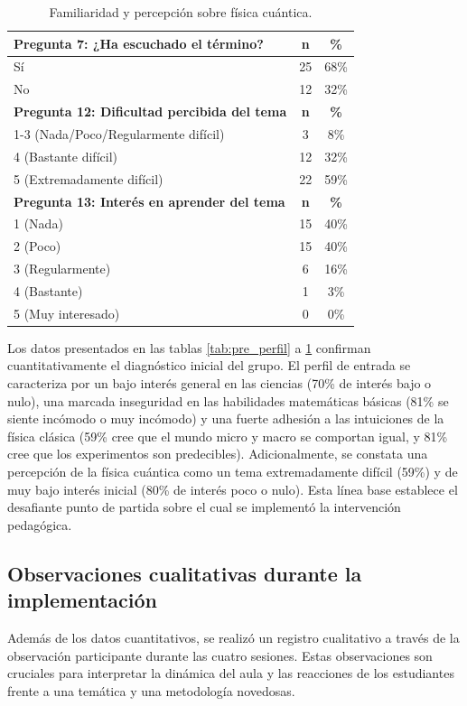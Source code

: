\documentclass[10pt,a4paper]{article}
\begin{document}
\begin{table}[h!]
\centering
\caption{Familiaridad y percepción sobre física cuántica.}
\label{tab:pre_quantum}
\begin{tabular}{|l|c|c|}
\hline
\textbf{Pregunta 7: ¿Ha escuchado el término?} & \textbf{n} & \textbf{\%} \\
\hline
Sí & 25 & 68\% \\
No & 12 & 32\% \\
\hline
\textbf{Pregunta 12: Dificultad percibida del tema} & \textbf{n} & \textbf{\%} \\
\hline
1-3 (Nada/Poco/Regularmente difícil) & 3 & 8\% \\
4 (Bastante difícil) & 12 & 32\% \\
5 (Extremadamente difícil) & 22 & 59\% \\
\hline
\textbf{Pregunta 13: Interés en aprender del tema} & \textbf{n} & \textbf{\%} \\
\hline
1 (Nada) & 15 & 40\% \\
2 (Poco) & 15 & 40\% \\
3 (Regularmente) & 6 & 16\% \\
4 (Bastante) & 1 & 3\% \\
5 (Muy interesado) & 0 & 0\% \\
\hline
\end{tabular}
\end{table}

Los datos presentados en las tablas \ref{tab:pre_perfil} a \ref{tab:pre_quantum} confirman cuantitativamente el diagnóstico inicial del grupo. El perfil de entrada se caracteriza por un bajo interés general en las ciencias (70\% de interés bajo o nulo), una marcada inseguridad en las habilidades matemáticas básicas (81\% se siente incómodo o muy incómodo) y una fuerte adhesión a las intuiciones de la física clásica (59\% cree que el mundo micro y macro se comportan igual, y 81\% cree que los experimentos son predecibles). Adicionalmente, se constata una percepción de la física cuántica como un tema extremadamente difícil (59\%) y de muy bajo interés inicial (80\% de interés poco o nulo). Esta línea base establece el desafiante punto de partida sobre el cual se implementó la intervención pedagógica.


\subsection{Observaciones cualitativas durante la implementación}

Además de los datos cuantitativos, se realizó un registro cualitativo a través de la observación participante durante las cuatro sesiones. Estas observaciones son cruciales para interpretar la dinámica del aula y las reacciones de los estudiantes frente a una temática y una metodología novedosas.
\end{document}
